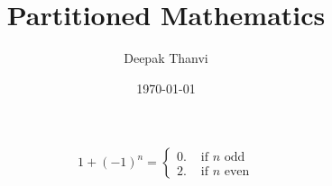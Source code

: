 \documentclass{article}
\title{Partitioned Mathematics}
\author{Deepak Thanvi}
\date{\today}
\begin{document}
\maketitle

\[
	1 + (-1) ^ n =
		\begin{cases}
			0. & \text{ if \(n\) odd} \\
			2. & \text{ if \(n\) even}
		\end{cases}	  
\]
\end{document}
